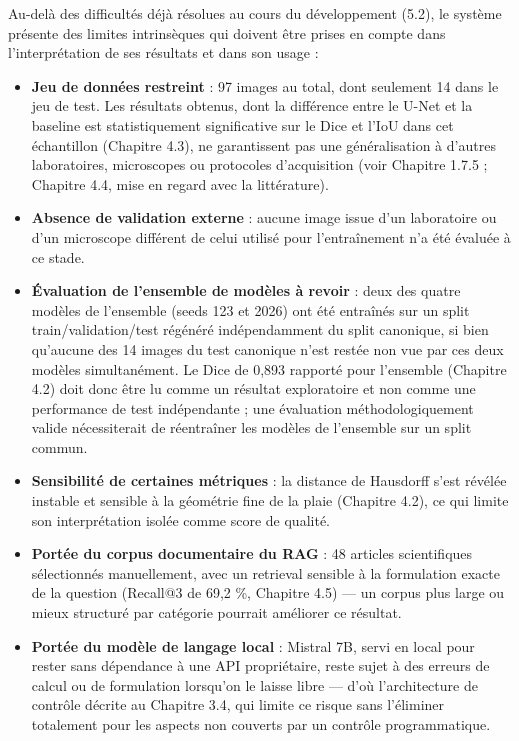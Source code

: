 \documentclass[12pt,a4paper]{report}
\begin{document}
Au-delà des difficultés déjà résolues au cours du développement (5.2), le système présente des limites intrinsèques qui doivent être prises en compte dans l'interprétation de ses résultats et dans son usage :

\begin{itemize}
\item \textbf{Jeu de données restreint} : 97 images au total, dont seulement 14 dans le jeu de test. Les résultats obtenus, dont la différence entre le U-Net et la baseline est statistiquement significative sur le Dice et l'IoU dans cet échantillon (Chapitre 4.3), ne garantissent pas une généralisation à d'autres laboratoires, microscopes ou protocoles d'acquisition (voir Chapitre 1.7.5 ; Chapitre 4.4, mise en regard avec la littérature).
\item \textbf{Absence de validation externe} : aucune image issue d'un laboratoire ou d'un microscope différent de celui utilisé pour l'entraînement n'a été évaluée à ce stade.
\item \textbf{Évaluation de l'ensemble de modèles à revoir} : deux des quatre modèles de l'ensemble (seeds 123 et 2026) ont été entraînés sur un split train/validation/test régénéré indépendamment du split canonique, si bien qu'aucune des 14 images du test canonique n'est restée non vue par ces deux modèles simultanément. Le Dice de 0,893 rapporté pour l'ensemble (Chapitre 4.2) doit donc être lu comme un résultat exploratoire et non comme une performance de test indépendante ; une évaluation méthodologiquement valide nécessiterait de réentraîner les modèles de l'ensemble sur un split commun.
\item \textbf{Sensibilité de certaines métriques} : la distance de Hausdorff s'est révélée instable et sensible à la géométrie fine de la plaie (Chapitre 4.2), ce qui limite son interprétation isolée comme score de qualité.
\item \textbf{Portée du corpus documentaire du RAG} : 48 articles scientifiques sélectionnés manuellement, avec un retrieval sensible à la formulation exacte de la question (Recall@3 de 69,2 \%, Chapitre 4.5) --- un corpus plus large ou mieux structuré par catégorie pourrait améliorer ce résultat.
\item \textbf{Portée du modèle de langage local} : Mistral 7B, servi en local pour rester sans dépendance à une API propriétaire, reste sujet à des erreurs de calcul ou de formulation lorsqu'on le laisse libre --- d'où l'architecture de contrôle décrite au Chapitre 3.4, qui limite ce risque sans l'éliminer totalement pour les aspects non couverts par un contrôle programmatique.

\end{itemize}
\end{document}

